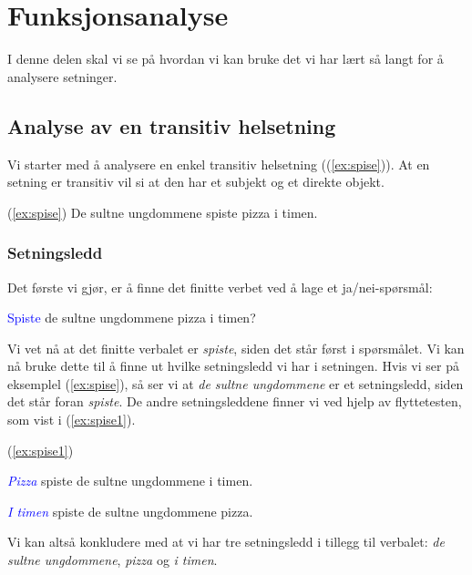 \documentclass{article}
\begin{document}
\section{Funksjonsanalyse}

I denne delen skal vi se p{\aa} hvordan vi kan bruke det vi har l{\ae}rt s{\aa} langt for {\aa} analysere setninger.

\subsection{Analyse av en transitiv helsetning}

Vi starter med {\aa} analysere en enkel transitiv helsetning ((\ref{ex:spise})). At en setning er transitiv vil si at den har et subjekt og et direkte objekt.

\begin{exe} 
\ex\label{ex:spise} (\ref{ex:spise}) De sultne ungdommene spiste pizza i timen.
\end{exe}

\subsubsection{Setningsledd}

Det f{\o}rste vi gj{\o}r, er {\aa} finne det finitte verbet ved {\aa} lage et ja/nei-sp{\o}rsm{\aa}l:

\begin{exe} 
\ex \textcolor{blue}{Spiste} de sultne ungdommene pizza i timen?
\end{exe}

Vi vet n{\aa} at det finitte verbalet er {\it spiste}, siden det st{\aa}r f{\o}rst i sp{\o}rsm{\aa}let. Vi kan n{\aa} bruke dette til {\aa} finne ut hvilke setningsledd vi har i setningen. Hvis vi ser p{\aa} eksemplel (\ref{ex:spise}), s{\aa} ser vi at {\it de sultne ungdommene} er et setningsledd, siden det st{\aa}r foran {\it spiste}. De andre setningsleddene finner vi ved hjelp av flyttetesten, som vist i (\ref{ex:spise1}).

\begin{exe} 
\ex\label{ex:spise1} (\ref{ex:spise1})
\begin{xlist} 
\ex \textcolor{blue}{\it Pizza} spiste de sultne ungdommene i timen.

\ex \textcolor{blue}{\it I timen} spiste de sultne ungdommene pizza.
\end{xlist}
\end{exe}

Vi kan alts{\aa} konkludere med at vi har tre setningsledd i tillegg til verbalet: {\it de sultne ungdommene}, {\it pizza} og {\it i timen}.
\end{document}
